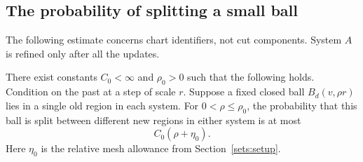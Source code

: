 \subsection{The probability of splitting a small ball}
The following estimate concerns chart identifiers, not cut components.
System $A$ is refined only after all the updates.

\begin{proposition}\label{pad:persistence}
There exist constants $C_0<\infty$ and $\rho_0>0$ such that the following
holds. Condition on the past at a step of scale $r$. Suppose a fixed
closed ball $B_d(v,\rho r)$ lies in a single old region in each system.
For $0<\rho\le\rho_0$, the probability that this ball is split between
different new regions in either system is at most
\begin{equation}\label{pad:loss}
 C_0(\rho+\eta_0).
\end{equation}
Here $\eta_0$ is the relative mesh allowance from
Section~\ref{sets:setup}.
\end{proposition}
